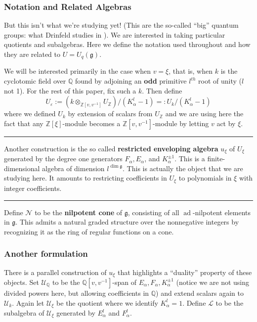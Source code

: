 \documentclass[12pt]{article}
\theoremstyle{nonumberbreak}
\theoremstyle{changebreak}
\theoremstyle{nonumberplain}
\theoremstyle{change}
\newcommand*{\bbZ}{\mathbb{Z}}
\newcommand*{\bbQ}{\mathbb{Q}}
\newcommand*{\g}{\mathfrak{g}}
\DeclareMathOperator{\ad}{ad}
\newcommand*{\brk}{
\rule{2in}{.1pt}
}
\begin{document}
\subsubsection{Notation and Related Algebras}\label{sec-defs}
But this isn't what we're studying yet! (This are the so-called ``big'' quantum groups: what Drinfeld studies in \cite{drinfeld}). 
We are interested in taking particular quotients and subalgebras. Here we define the notation used throughout and how they are related to $U=U_q(\g)$.

We will be interested primarily in the case when $v=\xi$, that is, when $k$ is the cyclotomic field over $\bbQ$ found by adjoining
an \textbf{odd} primitive $l^{th}$ root of unity ($l$ not 1). For the rest of this paper, fix such a $k$. Then define
\[U_\varepsilon :=(k\otimes_{\bbZ[v,v^{-1}]}U_\bbZ)/(K_\alpha^l-1)=:U_k/(K_\alpha^l-1)\]
where we defined $U_k$ by extension of scalars from $U_\bbZ$ and we are using here the fact that any $\bbZ[\xi]$-module 
becomes a $\bbZ[v,v^{-1}]$-module by letting $v$ act by $\xi$.

\brk

Another construction is the so called \textbf{restricted enveloping algebra} $u_\xi$ of $U_\xi$ generated by the 
degree one generators $F_\alpha, E_\alpha$, and $K^{\pm 1}_\alpha$. This is a finite-dimensional algebra of dimension $l^{\dim \g}$.
This is actually the object that we are studying here. It amounts to restricting coefficients in $U_\xi$ to polynomials in $\xi$ with integer coefficients.

\brk

Define $\mathcal N$ to be the \textbf{nilpotent cone} of $\g$, consisting of all $\ad$-nilpotent elements in $\g$. This admits a 
natural graded structure over the nonnegative integers by recognizing it as the ring of regular functions on a cone.

\subsubsection{Another formulation}

There is a parallel construction of $u_\xi$ that highlights a ``duality'' property of these objects. Set $\mathscr U_\bbQ$ to be the 
$\bbQ[v,v^{-1}]$-span of $E_\alpha,F_\alpha,K^{\pm 1}_\alpha$ (notice we are not using divided powers here, but allowing coefficients in $\bbQ$) 
and extend scalars again to $\mathscr U_k$. Again let $\mathscr U_\xi$ be the quotient
where we identify $K_\alpha^l=1$. Define $\mathscr L$ to be the subalgebra of $\mathscr U_\xi$ generated by $E_\alpha^l$ and $F_\alpha^l$.
\end{document}
